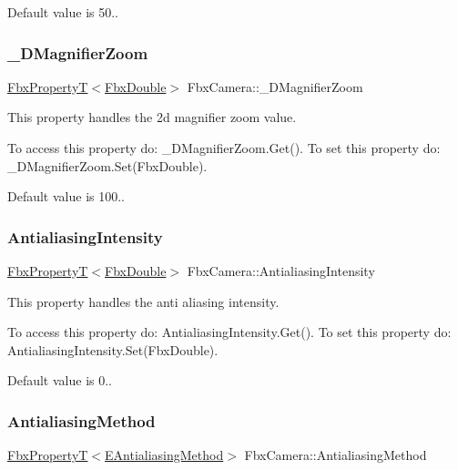 Default value is 50.. \mbox{\label{class_fbx_camera_ab60ab197ebbbf565d18dc7f7b2113f59}} 
\subsubsection{\texorpdfstring{\+\_\+D\+Magnifier\+Zoom}{\_2DMagnifierZoom}}
{\footnotesize\ttfamily \hyperlink{class_fbx_property_t}{Fbx\+PropertyT}$<$\hyperlink{fbxtypes_8h_a171e72a1c46fc15c1a6c9c31948c1c5b}{Fbx\+Double}$>$ Fbx\+Camera\+::\+\_\+D\+Magnifier\+Zoom}

This property handles the 2d magnifier zoom value.

To access this property do\+: \+\_\+D\+Magnifier\+Zoom.\+Get(). To set this property do\+: \+\_\+D\+Magnifier\+Zoom.\+Set(\+Fbx\+Double).

Default value is 100.. \mbox{\label{class_fbx_camera_a3e7ddc27aff98a3850f58d8b800b6613}} 
\subsubsection{\texorpdfstring{Antialiasing\+Intensity}{AntialiasingIntensity}}
{\footnotesize\ttfamily \hyperlink{class_fbx_property_t}{Fbx\+PropertyT}$<$\hyperlink{fbxtypes_8h_a171e72a1c46fc15c1a6c9c31948c1c5b}{Fbx\+Double}$>$ Fbx\+Camera\+::\+Antialiasing\+Intensity}

This property handles the anti aliasing intensity.

To access this property do\+: Antialiasing\+Intensity.\+Get(). To set this property do\+: Antialiasing\+Intensity.\+Set(\+Fbx\+Double).

Default value is 0.. \mbox{\label{class_fbx_camera_a1ad348a909fc9cd51173f5a424660ac1}} 
\subsubsection{\texorpdfstring{Antialiasing\+Method}{AntialiasingMethod}}
{\footnotesize\ttfamily \hyperlink{class_fbx_property_t}{Fbx\+PropertyT}$<$\hyperlink{class_fbx_camera_a44949ea304940f214a2f23a66dcbf45f}{E\+Antialiasing\+Method}$>$ Fbx\+Camera\+::\+Antialiasing\+Method}

